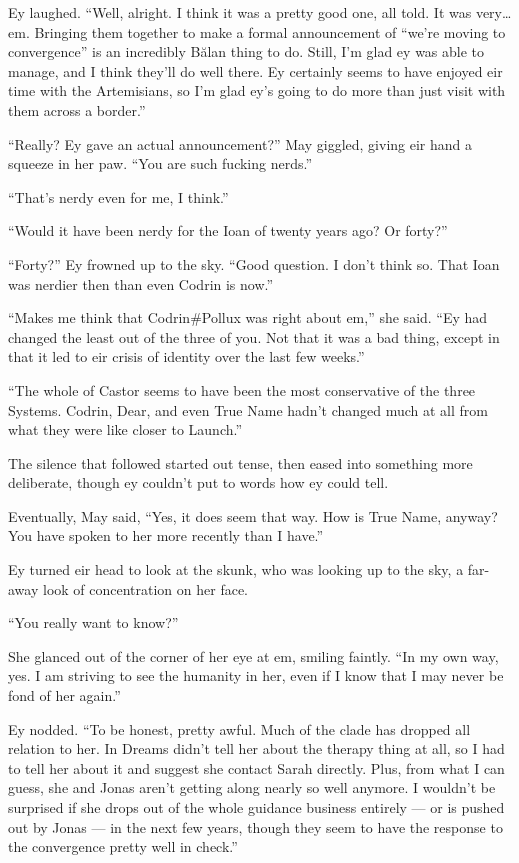 Ey laughed. ``Well, alright. I think it was a pretty good one, all told. It was very\ldots em. Bringing them together to make a formal announcement of ``we're moving to convergence'' is an incredibly Bălan thing to do. Still, I'm glad ey was able to manage, and I think they'll do well there. Ey certainly seems to have enjoyed eir time with the Artemisians, so I'm glad ey's going to do more than just visit with them across a border.''

``Really? Ey gave an actual announcement?'' May giggled, giving eir hand a squeeze in her paw. ``You are such fucking nerds.''

``That's nerdy even for me, I think.''

``Would it have been nerdy for the Ioan of twenty years ago? Or forty?''

``Forty?'' Ey frowned up to the sky. ``Good question. I don't think so. That Ioan was nerdier then than even Codrin is now.''

``Makes me think that Codrin\#Pollux was right about em,'' she said. ``Ey had changed the least out of the three of you. Not that it was a bad thing, except in that it led to eir crisis of identity over the last few weeks.''

``The whole of Castor seems to have been the most conservative of the three Systems. Codrin, Dear, and even True Name hadn't changed much at all from what they were like closer to Launch.''

The silence that followed started out tense, then eased into something more deliberate, though ey couldn't put to words how ey could tell.

Eventually, May said, ``Yes, it does seem that way. How is True Name, anyway? You have spoken to her more recently than I have.''

Ey turned eir head to look at the skunk, who was looking up to the sky, a far-away look of concentration on her face.

``You really want to know?''

She glanced out of the corner of her eye at em, smiling faintly. ``In my own way, yes. I am striving to see the humanity in her, even if I know that I may never be fond of her again.''

Ey nodded. ``To be honest, pretty awful. Much of the clade has dropped all relation to her. In Dreams didn't tell her about the therapy thing at all, so I had to tell her about it and suggest she contact Sarah directly. Plus, from what I can guess, she and Jonas aren't getting along nearly so well anymore. I wouldn't be surprised if she drops out of the whole guidance business entirely — or is pushed out by Jonas — in the next few years, though they seem to have the response to the convergence pretty well in check.''

